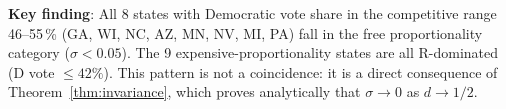 \noindent\textbf{Key finding}: All 8 states with Democratic vote share in
the competitive range 46--55\,\% (GA, WI, NC, AZ, MN, NV, MI, PA) fall in
the free proportionality category ($\sigma < 0.05$).
The 9 expensive-proportionality states are all R-dominated (D vote $\leq 42\%$).
This pattern is not a coincidence: it is a direct consequence of Theorem~\ref{thm:invariance},
which proves analytically that $\sigma \to 0$ as $d \to 1/2$.

